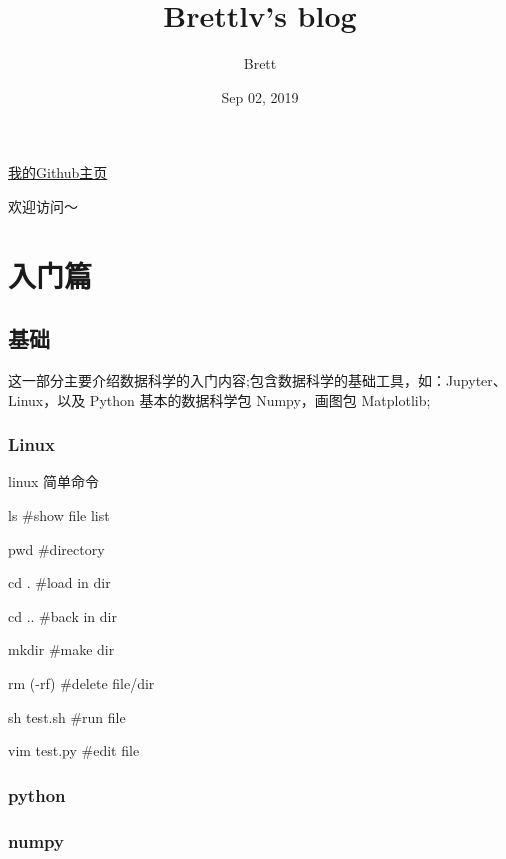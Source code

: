 \documentclass[letterpaper,10pt,english]{sphinxmanual}
\title{Brettlv's blog}
\date{Sep 02, 2019}
\author{Brett}
\begin{document}
\maketitle
\sphinxtableofcontents
{}\label{\detokenize{index::doc}}


\href{https://brettlv.github.io/}{我的Github主页}

欢迎访问～


\chapter{入门篇}
\label{\detokenize{base/index:welcome-to-brettlv-s-blog}}\label{\detokenize{base/index::doc}}\label{\detokenize{base/index:id1}}

\section{基础}
\label{\detokenize{base/index:id2}}
这一部分主要介绍数据科学的入门内容;包含数据科学的基础工具，如：Jupyter、Linux，以及 Python 基本的数据科学包 Numpy，画图包 Matplotlib;


\subsection{Linux}
\label{\detokenize{base/01_linux::doc}}\label{\detokenize{base/01_linux:linux}}
linux 简单命令

ls \#show file list

pwd \#directory

cd . \#load in dir

cd .. \#back in dir

mkdir \#make dir

rm (-rf) \#delete file/dir

sh test.sh \#run file

vim test.py \#edit file


\subsection{python}
\label{\detokenize{base/02_ipython:python}}\label{\detokenize{base/02_ipython::doc}}\label{\detokenize{base/02_ipython:vim}}

\subsection{numpy}
\label{\detokenize{base/03_numpy:numpy}}\label{\detokenize{base/03_numpy::doc}}
\end{document}
